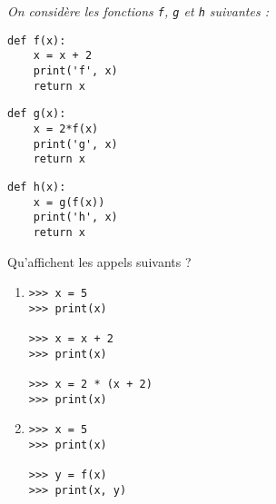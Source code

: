 \begin{td}\label{td:portee2}
\em
On considère les fonctions {\tt f}, {\tt g} et {\tt h} suivantes :
\begin{center}
\begin{py}{4cm}
\begin{verbatim}
def f(x):
    x = x + 2
    print('f', x)
    return x
\end{verbatim}
\end{py}\hspace*{1cm}
\begin{py}{4cm}
\begin{verbatim}
def g(x):
    x = 2*f(x)
    print('g', x)
    return x
\end{verbatim}
\end{py}\hspace*{1cm}
\begin{py}{4cm}
\begin{verbatim}
def h(x):
    x = g(f(x))
    print('h', x)
    return x
\end{verbatim}
\end{py}
\end{center}

Qu'affichent les appels suivants ?
\vspace*{2mm}

\begin{minipage}[t]{4cm}
\begin{enumerate}
\item 

\begin{py}{4cm}
\begin{verbatim}
>>> x = 5
>>> print(x)

>>> x = x + 2
>>> print(x)

>>> x = 2 * (x + 2)
>>> print(x)

\end{verbatim}
\end{py}
\end{enumerate}
\end{minipage}
\hfill
\begin{minipage}[t]{4cm}
\begin{enumerate}\setcounter{enumi}{1}
\item 

\begin{py}{4cm}
\begin{verbatim}
>>> x = 5
>>> print(x)

>>> y = f(x)
>>> print(x, y)


\end{verbatim}
\end{py}
\end{enumerate}
\end{minipage}
\end{td}

